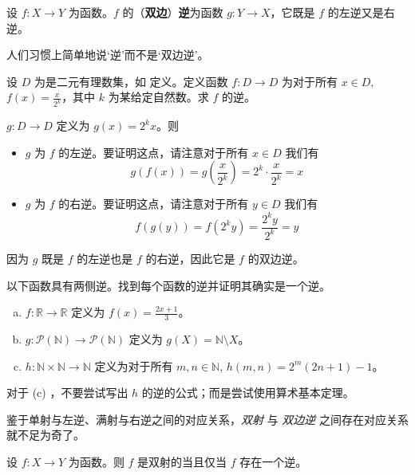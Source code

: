 \begin{definition}
\label{defInverse}
设 $f : X \to Y$ 为函数。$f$ 的（\textbf{双边}）\textbf{逆}为函数 $g : Y \to X$，它既是 $f$ 的左逆又是右逆。
\end{definition}

人们习惯上简单地说`逆'而不是`双边逆'。

\begin{example}
设 $D$ 为是二元有理数集，如  定义。定义函数 $f : D \to D$ 为对于所有 $x \in D$, $f(x)=\frac{x}{2^k}$，其中 $k$ 为某给定自然数。求 $f$ 的逆。

$g : D \to D$ 定义为 $g(x) = 2^kx$。则
\begin{itemize}
\item $g$ 为 $f$ 的左逆。要证明这点，请注意对于所有 $x \in D$ 我们有
\[ g(f(x)) = g(\frac{x}{2^k}) = 2^k \cdot \frac{x}{2^k} = x \]
\item $g$ 为 $f$ 的右逆。要证明这点，请注意对于所有 $y \in D$ 我们有
\[ f(g(y)) = f(2^ky) = \frac{2^ky}{2^k} = y \]
\end{itemize}
因为 $g$ 既是 $f$ 的左逆也是 $f$ 的右逆，因此它是 $f$ 的双边逆。
\end{example}

\begin{exercise}
\label{exFindTwoSidedInverses}
以下函数具有两侧逆。找到每个函数的逆并证明其确实是一个逆。
\begin{enumerate}[(a)]
\item $f : \mathbb{R} \to \mathbb{R}$ 定义为 $f(x)=\frac{2x+1}{3}$。
\item $g : \mathcal{P}(\mathbb{N}) \to \mathcal{P}(\mathbb{N})$ 定义为 $g(X) = \mathbb{N} \setminus X$。
\item $h : \mathbb{N} \times \mathbb{N} \to \mathbb{N}$ 定义为对于所有 $m,n \in \mathbb{N}$, $h(m,n) = 2^m(2n+1)-1$。
\end{enumerate}
\begin{backhint}
对于 (c) ，不要尝试写出 $h$ 的逆的公式；而是尝试使用算术基本定理。
\end{backhint}
\end{exercise}

鉴于单射与左逆、满射与右逆之间的对应关系，\textit{双射} 与 \textit{双边逆} 之间存在对应关系就不足为奇了。

\begin{exercise}
\label{exBijectiveIffHasInverse}
设 $f : X \to Y$ 为函数。则 $f$ 是双射的当且仅当 $f$ 存在一个逆。
\end{exercise}

